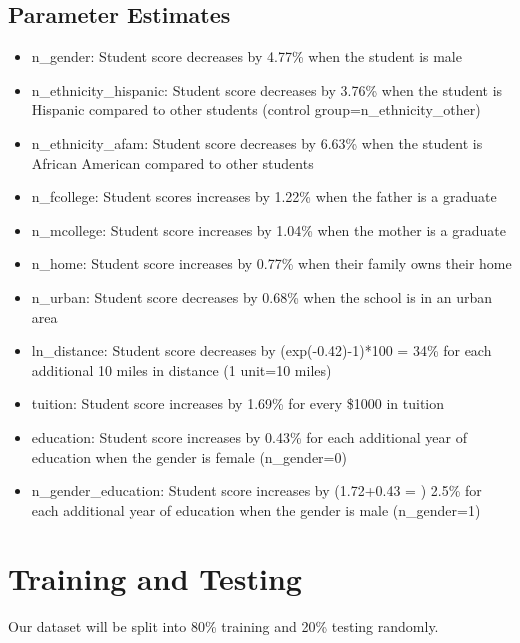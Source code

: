 \documentclass[12pt]{article}
\begin{document}
\subsection{Parameter Estimates}
\begin{itemize}
    \item n\_gender: Student score decreases by 4.77\% when the student is male
    \item n\_ethnicity\_hispanic: Student score decreases by 3.76\% when the student is Hispanic compared to other students (control group=n\_ethnicity\_other)
    \item n\_ethnicity\_afam: Student score decreases by 6.63\% when the student is African American compared to other students
    \item n\_fcollege: Student scores increases by 1.22\% when the father is a graduate
    \item n\_mcollege: Student score increases by 1.04\% when the mother is a graduate
    \item n\_home: Student score increases by 0.77\% when their family owns their home
    \item n\_urban: Student score decreases by 0.68\% when the school is in an urban area
    \item ln\_distance: Student score decreases by (exp(-0.42)-1)*100 = 34\% for each additional 10 miles in distance (1 unit=10 miles)
    \item tuition: Student score increases by 1.69\% for every \$1000 in tuition
    \item education: Student score increases by 0.43\% for each additional year of education when the gender is female (n\_gender=0)
    \item n\_gender\_education: Student score increases by (1.72+0.43 = ) 2.5\% for each additional year of education when the gender is male (n\_gender=1)
\end{itemize}

\section{Training and Testing}
Our dataset will be split into 80\% training and 20\% testing randomly. 
\end{document}

